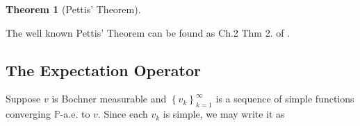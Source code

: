 \documentclass{article}
\newtheorem{theorem}{Theorem}
\numberwithin{theorem}{section}
\numberwithin{lemma}{section}
\numberwithin{definition}{section}
\numberwithin{assumption}{section}
\numberwithin{proposition}{section}
\numberwithin{remark}{section}
\numberwithin{corollary}{section}
\numberwithin{conjecture}{section}
\numberwithin{example}{section}
\newcommand{\bset}[1]{\left \lbrace #1 \right \rbrace}
\newcommand{\aset}[1]{\left \langle #1 \right \rangle}
\newcommand{\D}{\displaystyle}
\newcommand{\intp}[1] {\D \int_\Omega {#1 } \; d \mathbb P}
\begin{document}
\begin{multicols*}{2}
\begin{theorem} [Pettis' Theorem]
\begin{enumerate}

    \end{enumerate}
\end{theorem}

The well known Pettis' Theorem can be found as Ch.2 Thm 2. of \cite{DiestelUhl1977}. 








    


\subsection{The Expectation Operator}
\label{The Expectation Operator}

Suppose $v$ is Bochner measurable and $\bset{v_k}_{k=1}^\infty$ is a sequence of simple functions converging $\mathbb P$-a.e. to $v$. Since each $v_k$ is simple, we may write it as 


\end{multicols*}
\end{document}
